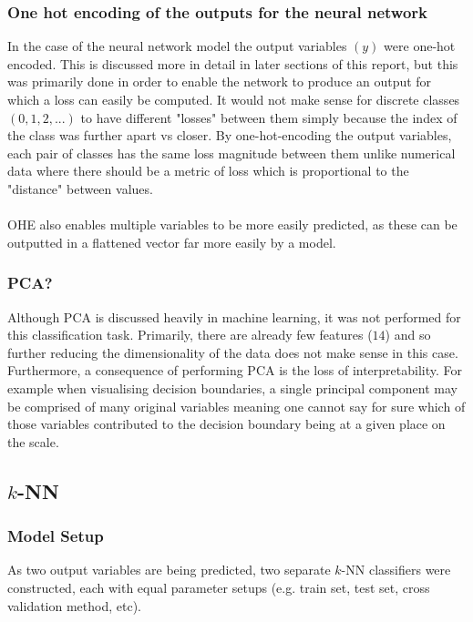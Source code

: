 \documentclass{article}
\begin{document}
\subsubsection{One hot encoding of the outputs for the neural network}

In the case of the neural network model the output variables $(y)$ were one-hot encoded. This is discussed more in detail in later sections of this report, but this was primarily done in order to enable the network to produce an output for which a loss can easily be computed. It would not make sense for discrete classes $(0, 1, 2, ...)$ to have different "losses" between them simply because the index of the class was further apart vs closer. By one-hot-encoding the output variables, each pair of classes has the same loss magnitude between them unlike numerical data where there should be a metric of loss which is proportional to the "distance" between values. \\
\\
OHE also enables multiple variables to be more easily predicted, as these can be outputted in a flattened vector far more easily by a model.

\subsubsection{PCA?}

Although PCA is discussed heavily in machine learning, it was not performed for this classification task. Primarily, there are already few features ($14$) and so further reducing the dimensionality of the data does not make sense in this case. Furthermore, a consequence of performing PCA is the loss of interpretability. For example when visualising decision boundaries, a single principal component may be comprised of many original variables meaning one cannot say for sure which of those variables contributed to the decision boundary being at a given place on the scale.


\subsection{$k$-NN}

\subsubsection{Model Setup}

As two output variables are being predicted, two separate $k$-NN classifiers were constructed, each with equal parameter setups (e.g. train set, test set, cross validation method, etc).
\end{document}
